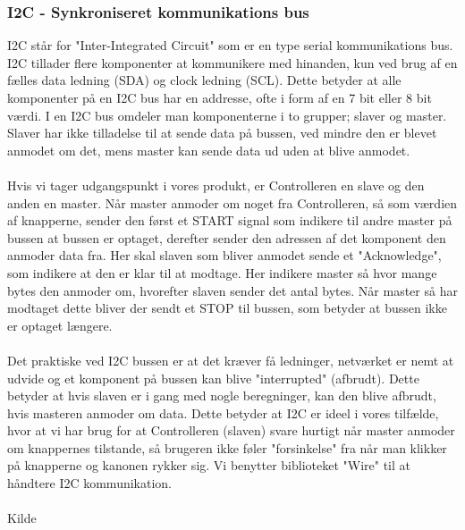 \subsubsection{I2C - Synkroniseret kommunikations bus}
I2C står for "Inter-Integrated Circuit" som er en type serial kommunikations bus. I2C tillader flere komponenter at kommunikere med hinanden, kun ved brug af en fælles data ledning (SDA) og clock ledning (SCL). Dette betyder at alle komponenter på en I2C bus har en addresse, ofte i form af en 7 bit eller 8 bit værdi. I en I2C bus omdeler man komponenterne i to grupper; slaver og master. Slaver har ikke tilladelse til at sende data på bussen, ved mindre den er blevet anmodet om det, mens master kan sende data ud uden at blive anmodet.
\\
\\
Hvis vi tager udgangspunkt i vores produkt, er Controlleren en slave og den anden en master. Når master anmoder om noget fra Controlleren, så som værdien af knapperne, sender den først et START signal som indikere til andre master på bussen at bussen er optaget, derefter sender den adressen af det komponent den anmoder data fra. Her skal slaven som bliver anmodet sende et "Acknowledge", som indikere at den er klar til at modtage. Her indikere master så hvor mange bytes den anmoder om, hvorefter slaven sender det antal bytes. Når master så har modtaget dette bliver der sendt et STOP til bussen, som betyder at bussen ikke er optaget længere.\\
\\
Det praktiske ved I2C bussen er at det kræver få ledninger, netværket er nemt at udvide og et komponent på bussen kan blive "interrupted" (afbrudt). Dette betyder at hvis slaven er i gang med nogle beregninger, kan den blive afbrudt, hvis masteren anmoder om data. Dette betyder at I2C er ideel i vores tilfælde, hvor at vi har brug for at Controlleren (slaven) svare hurtigt når master anmoder om knappernes tilstande, så brugeren ikke føler "forsinkelse" fra når man klikker på knapperne og kanonen rykker sig. Vi benytter biblioteket "Wire" til at håndtere I2C kommunikation.
\\
\\
Kilde \cite{arduino:ITWOC}
